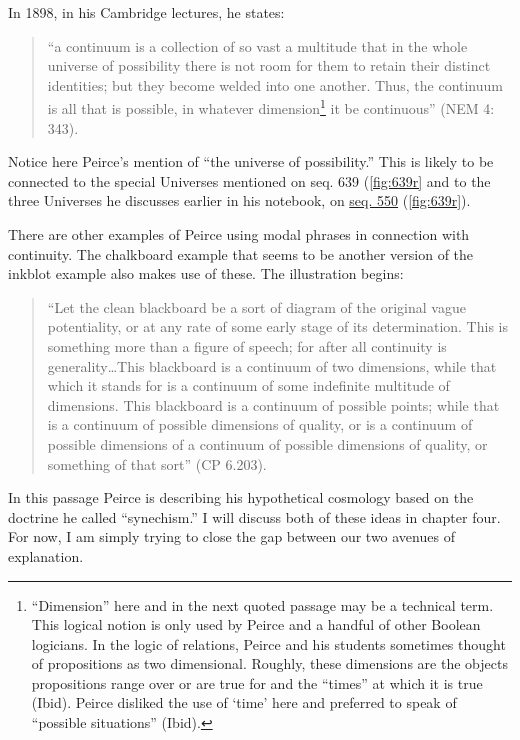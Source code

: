In 1898, in his Cambridge lectures, he states:
\begin{quotation}
\noindent``a continuum is a collection of so vast a multitude that in the whole universe of possibility there is not room for them to retain their distinct identities; but they become welded into one another. Thus, the continuum is all that is possible, in whatever dimension\footnote{``Dimension'' here and in the next quoted passage may be a technical term. This logical notion is only used by Peirce and a handful of other Boolean logicians\citep{dipert_life_1994}. In the logic of relations, Peirce and his students sometimes thought of propositions as two dimensional. Roughly, these dimensions are the objects propositions range over or are true for and the ``times'' at which it is true (Ibid). Peirce disliked the use of `time' here and preferred to speak of ``possible situations'' (Ibid).} it be continuous'' (NEM 4: 343).
\end{quotation}
\noindent  Notice here Peirce's mention of ``the universe of possibility.'' This is likely to be connected to the special Universes mentioned on seq. 639 (\ref{fig:639r} and to the three Universes he discusses earlier in his notebook, on \href{https://iiif.lib.harvard.edu/manifests/view/drs:15255301$550i}{seq. 550} (\ref{fig:639r}).

There are other examples of Peirce using modal phrases in connection with continuity. The chalkboard example that seems to be another version of the inkblot example also makes use of these. The illustration begins:
\begin{quotation}
 \noindent``Let the clean blackboard be a sort of diagram of the original vague potentiality, or at any rate of some early stage of its determination. This is something more than a figure of speech; for after all continuity is generality\dots This blackboard is a continuum of two dimensions, while that which it stands for is a continuum of some indefinite multitude of dimensions. This blackboard is a continuum of possible points; while that is a continuum of possible dimensions of quality, or is a continuum of possible dimensions of a continuum of possible dimensions of quality, or something of that sort'' (CP 6.203).
\end{quotation}
\noindent In this passage Peirce is describing his hypothetical cosmology based on the doctrine he called ``synechism.'' I will discuss both of these ideas in chapter four. For now, I am simply trying to close the gap between our two avenues of explanation.

